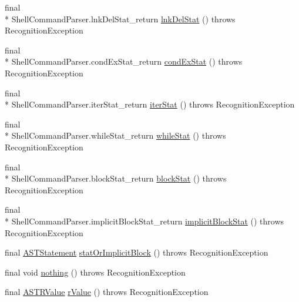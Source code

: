 \begin{DoxyCompactItemize}
\item 
final \\*
Shell\-Command\-Parser.\-lnk\-Del\-Stat\-\_\-return \hyperlink{classorg_1_1tzi_1_1use_1_1parser_1_1shell_1_1_shell_command_parser_a44bf47956bd4c1248080224fd5c90b9f}{lnk\-Del\-Stat} ()  throws Recognition\-Exception 
\item 
final \\*
Shell\-Command\-Parser.\-cond\-Ex\-Stat\-\_\-return \hyperlink{classorg_1_1tzi_1_1use_1_1parser_1_1shell_1_1_shell_command_parser_ac4b606824d00dbddba92c1ace92df4fb}{cond\-Ex\-Stat} ()  throws Recognition\-Exception 
\item 
final \\*
Shell\-Command\-Parser.\-iter\-Stat\-\_\-return \hyperlink{classorg_1_1tzi_1_1use_1_1parser_1_1shell_1_1_shell_command_parser_a5b83c558027dfe0f8de455c3a274afe3}{iter\-Stat} ()  throws Recognition\-Exception 
\item 
final \\*
Shell\-Command\-Parser.\-while\-Stat\-\_\-return \hyperlink{classorg_1_1tzi_1_1use_1_1parser_1_1shell_1_1_shell_command_parser_aa0c4feda1cf893b01208d58459a17b07}{while\-Stat} ()  throws Recognition\-Exception 
\item 
final \\*
Shell\-Command\-Parser.\-block\-Stat\-\_\-return \hyperlink{classorg_1_1tzi_1_1use_1_1parser_1_1shell_1_1_shell_command_parser_acd05461af416b9929e15c7506951cbb2}{block\-Stat} ()  throws Recognition\-Exception 
\item 
final \\*
Shell\-Command\-Parser.\-implicit\-Block\-Stat\-\_\-return \hyperlink{classorg_1_1tzi_1_1use_1_1parser_1_1shell_1_1_shell_command_parser_a242ba7bab2e9f9deeafd2b250b5ddbbe}{implicit\-Block\-Stat} ()  throws Recognition\-Exception 
\item 
final \hyperlink{classorg_1_1tzi_1_1use_1_1parser_1_1soil_1_1ast_1_1_a_s_t_statement}{A\-S\-T\-Statement} \hyperlink{classorg_1_1tzi_1_1use_1_1parser_1_1shell_1_1_shell_command_parser_a5b69c3010d3a7c9f4f548b3642202c49}{stat\-Or\-Implicit\-Block} ()  throws Recognition\-Exception 
\item 
final void \hyperlink{classorg_1_1tzi_1_1use_1_1parser_1_1shell_1_1_shell_command_parser_a3af75580e38c28c51c56d036cbbb548a}{nothing} ()  throws Recognition\-Exception 
\item 
final \hyperlink{classorg_1_1tzi_1_1use_1_1parser_1_1soil_1_1ast_1_1_a_s_t_r_value}{A\-S\-T\-R\-Value} \hyperlink{classorg_1_1tzi_1_1use_1_1parser_1_1shell_1_1_shell_command_parser_a67a83809f117bfb4621b3232294e4236}{r\-Value} ()  throws Recognition\-Exception 

\end{DoxyCompactItemize}
